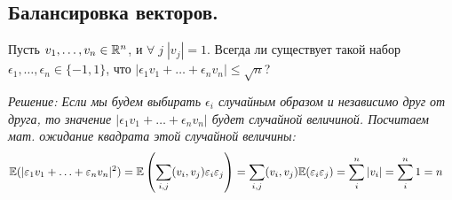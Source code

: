 \subsection{Балансировка векторов.}
\begin{problem}
    Пусть $v_1, \ldots, v_n \in \mathbb{R}^n$, и $\forall\;j\; |v_j| = 1$. Всегда ли существует такой набор
    $\epsilon_1, \ldots, \epsilon_n \in \{-1, 1\}$, что $|\epsilon_1v_1 + \ldots + \epsilon_nv_n| \leq \sqrt{n}$?

    \it{Решение:} Если мы будем выбирать $\epsilon_i$ случайным образом и независимо друг от друга,
    то значение $|\epsilon_1v_1 + \ldots + \epsilon_nv_n|$ будет случайной величиной.
    Посчитаем мат. ожидание квадрата этой случайной величины:
    \begin{align*}
        &\mathbb{E}(|\varepsilon_1v_1 + \ldots + \varepsilon_nv_n|^2) = \mathbb{E}\left( \sum\limits_{i, j} (v_i, v_j) \varepsilon_i\varepsilon_j \right)
        =\sum\limits_{i, j} (v_i, v_j) \mathbb{E}(\varepsilon_i\varepsilon_j) = \sum\limits_{i}^n |v_i| = \sum\limits_{i}^n 1 = n
    \end{align*}
\end{problem}
\begin{comment}
    По определению длины вектора: $|v| = \sqrt{(v, v)}$, т.е.
    \[
        \left| \sum\limits_{j} \epsilon_{j}v_j \right|^2 =
        \sqrt{\left( \sum\limits_{i} \epsilon_{i}v_i, \sum\limits_{j} \epsilon_{j}v_j \right)^2} =
        \left( \sum\limits_{i} \epsilon_{i}v_i, \sum\limits_{j} \epsilon_{j}v_j \right) =
        \sum\limits_{i, j} (v_i, v_j) \epsilon_i\epsilon_j
    \]
    Заметим так же, что при $i \neq j$ мы имеем $\EE(\epsilon_i\epsilon_j) = \EE(\epsilon_i)\EE(\epsilon_j)$
    (в силу независимости выбора $\epsilon_i$) и $\EE(\epsilon_i)\EE(\epsilon_j) =
    \left( 1\cdot\frac{1}{2} + (-1)\cdot\frac{1}{2} \right) \cdot 2 = 0$
    в силу того, что мы выбираем $\epsilon_i$ равновероятно с вероятностью
    выбора $\frac{1}{2}$.

    С другой стороны, при $i = j$ имеем $\sum\limits_{i} (v_i, v_i) = |v_i|^2$ и $\EE(\epsilon_i)\EE(\epsilon_i) =
    \EE(\epsilon_i^2) = 1$.
\end{comment}

\label{Discrete_dispers_etc}
